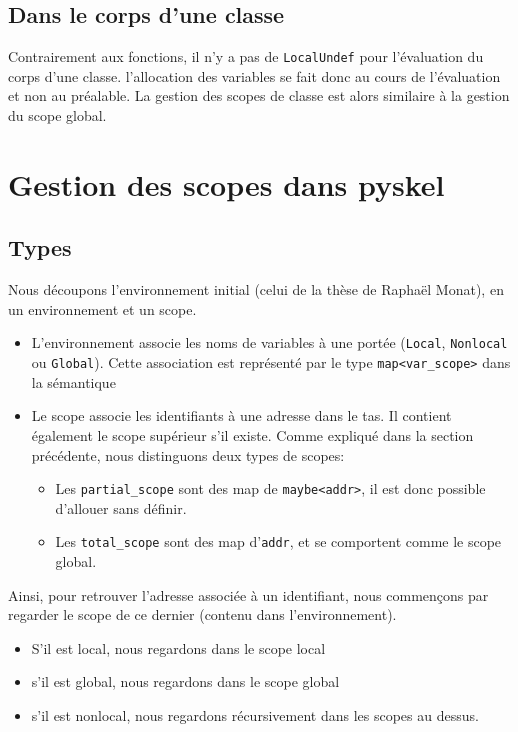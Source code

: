 \documentclass[a4paper, french, 11pt]{article}
\theoremstyle{break}
\begin{document}
\subsection{Dans le corps d'une classe}
Contrairement aux fonctions, il n'y a pas de \texttt{LocalUndef} pour l'évaluation du corps d'une classe.
l'allocation des variables se fait donc au cours de l'évaluation et non au préalable.
La gestion des scopes de classe est alors similaire à la gestion du scope global.

\section{\label{pyskel}Gestion des scopes dans pyskel}
\subsection{Types}

Nous découpons l'environnement initial (celui de la thèse de Raphaël Monat), en un environnement et un scope.

\begin{itemize}
  \item L'environnement associe les noms de variables à une portée (\texttt{Local}, \texttt{Nonlocal} ou \texttt{Global}). Cette association est représenté par le type \texttt{map<var\_scope>} dans la sémantique
  \item Le scope associe les identifiants à une adresse dans le tas. Il contient également le scope supérieur s'il existe.
    Comme expliqué dans la section précédente, nous distinguons deux types de scopes:
    \begin{itemize}
    \item Les \texttt{partial\_scope} sont des map de \texttt{maybe<addr>}, il est donc possible d'allouer sans définir.
    \item Les \texttt{total\_scope} sont des map d'\texttt{addr}, et se comportent comme le scope global.
    \end{itemize}
\end{itemize}

Ainsi, pour retrouver l'adresse associée à un identifiant, nous commençons par regarder le scope de ce dernier (contenu dans l'environnement).
\begin{itemize}
  \item S'il est local, nous regardons dans le scope local
  \item s'il est global, nous regardons dans le scope global
  \item s'il est nonlocal, nous regardons récursivement dans les scopes au dessus.
\end{itemize}
\end{document}
